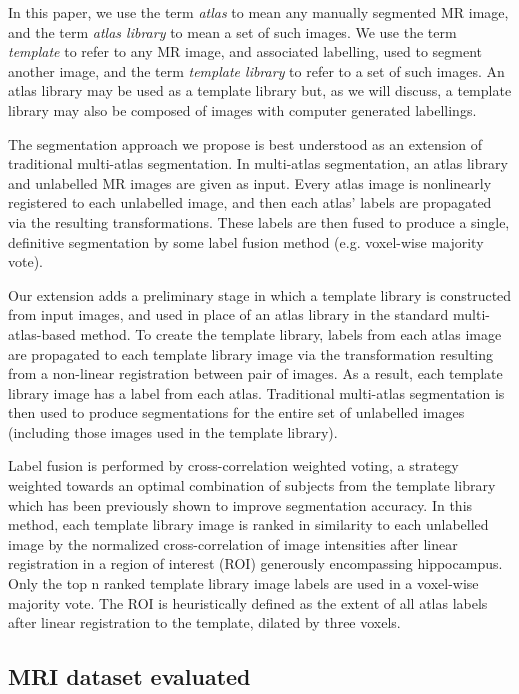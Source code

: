 \documentclass{article}\usepackage{graphicx, color}
\begin{document}
In this paper, we use the term {\it atlas} to mean any manually segmented MR
image, and the term {\it atlas library} to mean a set of such images.  We use
the term {\it template} to refer to any MR image, and associated labelling,
used to segment another image, and the term {\it template library} to refer to
a set of such images.  An atlas library may be used as a template library but,
as we will discuss, a template library may also be composed of images with
computer generated labellings. 

The segmentation approach we propose is best understood as an extension of
traditional multi-atlas segmentation.  In multi-atlas segmentation, an atlas
library and unlabelled MR images are given as input.  Every atlas image is
nonlinearly registered to each unlabelled image, and then each atlas' labels
are propagated via the resulting transformations.  These labels are then fused
to produce a single, definitive segmentation by some label fusion method (e.g.
voxel-wise majority vote). 

Our extension adds a preliminary stage in which a template library is
constructed from input images, and used in place of an atlas library in the
standard multi-atlas-based method.  To create the template library, labels from
each atlas image are propagated to each template library image via the
transformation resulting from a non-linear registration between pair of images.
As a result, each template library image has a label from each atlas.
Traditional multi-atlas segmentation is then used to produce segmentations for
the entire set of unlabelled images (including those images used in the
template library). 

Label fusion is performed by cross-correlation weighted voting, a strategy
weighted towards an optimal combination of subjects from the template library
which has been previously shown to improve segmentation
accuracy\cite{Aljabar2009,Collins2010}. In this method, each template library
image is ranked in similarity to each unlabelled image by the normalized
cross-correlation of image intensities after linear registration in a region of
interest (ROI) generously encompassing hippocampus.  Only the top n ranked
template library image labels are used in a voxel-wise majority vote. The ROI
is heuristically defined as the extent of all atlas labels after linear
registration to the template, dilated by three voxels\cite{Chakravarty2012}.

\subsection{MRI dataset evaluated}
\end{document}
